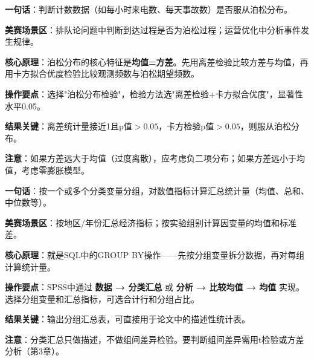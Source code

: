 
\begin{algobrief}
\textbf{一句话}：判断计数数据（如每小时来电数、每天事故数）是否服从泊松分布。

\textbf{美赛场景区}：排队论问题中判断到达过程是否为泊松过程；运营优化中分析事件发生规律。

\textbf{核心原理}：泊松分布的核心特征是\textbf{均值=方差}。先用离差检验比较方差与均值，再用卡方拟合优度检验比较观测频数与泊松期望频数。

\textbf{操作要点}：选择"泊松分布检验"，检验方法选"离差检验+卡方拟合优度"，显著性水平0.05。

\textbf{结果关键}：离差统计量接近1且p值$>0.05$，卡方检验p值$>0.05$，则服从泊松分布。

\textbf{注意}：如果方差远大于均值（过度离散），应考虑负二项分布；如果方差远小于均值，考虑零膨胀模型。
\end{algobrief}


\begin{algobrief}
\textbf{一句话}：按一个或多个分类变量分组，对数值指标计算汇总统计量（均值、总和、中位数等）。

\textbf{美赛场景区}：按地区/年份汇总经济指标；按实验组别计算因变量的均值和标准差。

\textbf{核心原理}：就是SQL中的GROUP BY操作——先按分组变量拆分数据，再对每组计算统计量。

\textbf{操作要点}：SPSS中通过 \textbf{数据 → 分类汇总} 或 \textbf{分析 → 比较均值 → 均值} 实现。选择分组变量和汇总指标，可选合计行和分组占比。

\textbf{结果关键}：输出分组汇总表，可直接用于论文中的描述性统计表。

\textbf{注意}：分类汇总只做描述，不做组间差异检验。要判断组间差异需用t检验或方差分析（第3章）。
\end{algobrief}
